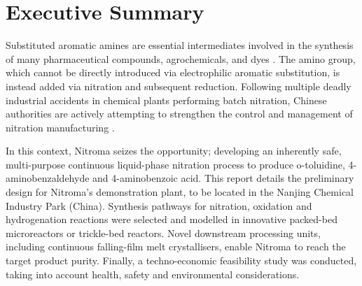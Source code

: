 \section*{Executive Summary}
\label{sec:exec-summary}

Substituted aromatic amines are essential intermediates involved in the synthesis of many pharmaceutical compounds, agrochemicals, and dyes \cite{vogt_amines_2000}. The amino group, which cannot be directly introduced via electrophilic aromatic substitution, is instead added via nitration and subsequent reduction. Following multiple deadly industrial accidents in chemical plants performing batch nitration, Chinese authorities are actively attempting to strengthen the control and management of nitration manufacturing \cite{el_diario_china_2019}.

In this context, Nitroma seizes the opportunity; developing an inherently safe, multi-purpose continuous liquid-phase nitration process to produce o-toluidine, 4-aminobenzaldehyde and 4-aminobenzoic acid. This report details the preliminary design for Nitroma’s demonstration plant, to be located in the Nanjing Chemical Industry Park (China). Synthesis pathways for nitration, oxidation and hydrogenation reactions were selected and modelled in innovative packed-bed microreactors or trickle-bed reactors. Novel downstream processing units, including continuous falling-film melt crystallisers, enable Nitroma to reach the target product purity. Finally, a techno-economic feasibility study was conducted, taking into account health, safety and environmental considerations.
